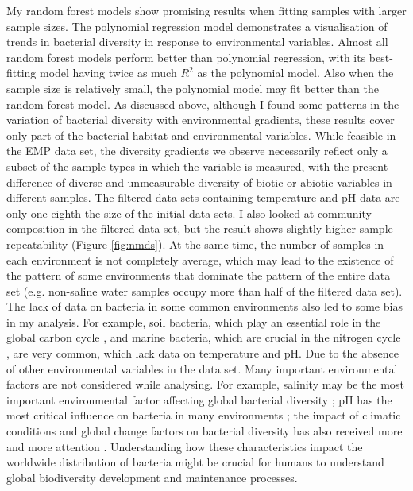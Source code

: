 \documentclass[11pt, a4paper]{article}
\begin{document}
\begin{spacing}{1.5}
My random forest models show promising results when fitting samples with larger sample sizes. The polynomial regression model demonstrates a visualisation of trends in bacterial diversity in response to environmental variables. Almost all random forest models perform better than polynomial regression, with its best-fitting model having twice as much $R^{2}$ as the polynomial model. Also when the sample size is relatively small, the polynomial model may fit better than the random forest model. As discussed above, although I found some patterns in the variation of bacterial diversity with environmental gradients, these results cover only part of the bacterial habitat and environmental variables. While feasible in the EMP data set, the diversity gradients we observe necessarily reflect only a subset of the sample types in which the variable is measured, with the present difference of diverse and unmeasurable diversity of biotic or abiotic variables in different samples. The filtered data sets containing temperature and pH data are only one-eighth the size of the initial data sets. I also looked at community composition in the filtered data set, but the result shows slightly higher sample repeatability (Figure \ref{fig:nmds}). At the same time, the number of samples in each environment is not completely average, which may lead to the existence of the pattern of some environments that dominate the pattern of the entire data set (e.g. non-saline water samples occupy more than half of the filtered data set). The lack of data on bacteria in some common environments also led to some bias in my analysis. For example, soil bacteria, which play an essential role in the global carbon cycle \citep{reay2007greenhouse}, and marine bacteria, which are crucial in the nitrogen cycle \citep{halm2012heterotrophic}, are very common, which lack data on temperature and pH. Due to the absence of other environmental variables in the data set. Many important environmental factors are not considered while analysing. For example, salinity may be the most important environmental factor affecting global bacterial diversity \citep{lozupone2007global}; pH has the most critical influence on bacteria in many environments \citep{bunse2016response, fierer2006diversity,fierer2011microbes}; the impact of climatic conditions and global change factors on bacterial diversity has also received more and more attention \citep{drenovsky2010land, picazo2020climate, scherrer2010infra, zhou2020meta}. Understanding how these characteristics impact the worldwide distribution of bacteria might be crucial for humans to understand global biodiversity development and maintenance processes.


\end{spacing}
\end{document}

